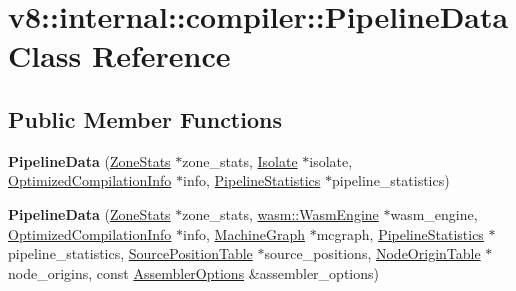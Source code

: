 \hypertarget{classv8_1_1internal_1_1compiler_1_1PipelineData}{}\section{v8\+:\+:internal\+:\+:compiler\+:\+:Pipeline\+Data Class Reference}
\label{classv8_1_1internal_1_1compiler_1_1PipelineData}
\subsection*{Public Member Functions}
\begin{DoxyCompactItemize}
\item 
\mbox{\label{classv8_1_1internal_1_1compiler_1_1PipelineData_aab0a50d62f455bba822d4c778be7b1b1}} 
{\bfseries Pipeline\+Data} (\mbox{\hyperlink{classv8_1_1internal_1_1compiler_1_1ZoneStats}{Zone\+Stats}} $\ast$zone\+\_\+stats, \mbox{\hyperlink{classv8_1_1internal_1_1Isolate}{Isolate}} $\ast$isolate, \mbox{\hyperlink{classv8_1_1internal_1_1OptimizedCompilationInfo}{Optimized\+Compilation\+Info}} $\ast$info, \mbox{\hyperlink{classv8_1_1internal_1_1compiler_1_1PipelineStatistics}{Pipeline\+Statistics}} $\ast$pipeline\+\_\+statistics)
\item 
\mbox{\label{classv8_1_1internal_1_1compiler_1_1PipelineData_ae18a972b745237fca1a87b6dff7eb2a7}} 
{\bfseries Pipeline\+Data} (\mbox{\hyperlink{classv8_1_1internal_1_1compiler_1_1ZoneStats}{Zone\+Stats}} $\ast$zone\+\_\+stats, \mbox{\hyperlink{classv8_1_1internal_1_1wasm_1_1WasmEngine}{wasm\+::\+Wasm\+Engine}} $\ast$wasm\+\_\+engine, \mbox{\hyperlink{classv8_1_1internal_1_1OptimizedCompilationInfo}{Optimized\+Compilation\+Info}} $\ast$info, \mbox{\hyperlink{classv8_1_1internal_1_1compiler_1_1MachineGraph}{Machine\+Graph}} $\ast$mcgraph, \mbox{\hyperlink{classv8_1_1internal_1_1compiler_1_1PipelineStatistics}{Pipeline\+Statistics}} $\ast$pipeline\+\_\+statistics, \mbox{\hyperlink{classv8_1_1internal_1_1compiler_1_1SourcePositionTable}{Source\+Position\+Table}} $\ast$source\+\_\+positions, \mbox{\hyperlink{classv8_1_1internal_1_1compiler_1_1NodeOriginTable}{Node\+Origin\+Table}} $\ast$node\+\_\+origins, const \mbox{\hyperlink{structv8_1_1internal_1_1AssemblerOptions}{Assembler\+Options}} \&assembler\+\_\+options)
\item 

\end{DoxyCompactItemize}
